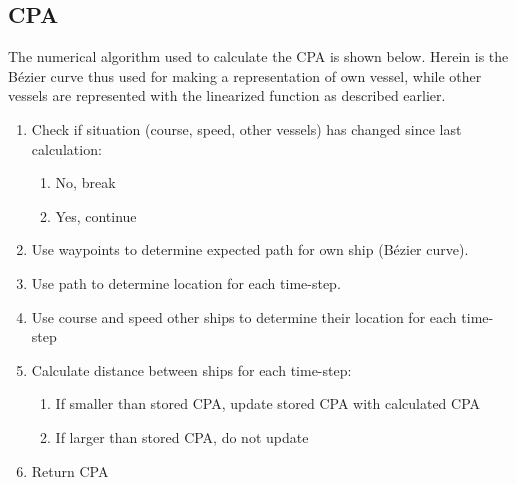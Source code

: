 \subsection{\acf{CPA}}
The numerical algorithm used to calculate the CPA is shown below. Herein is the Bézier curve thus used for making a representation of own vessel, while other vessels are represented with the linearized function as described earlier.
\begin{enumerate}
	\item Check if situation (course, speed, other vessels) has changed since last calculation:
	\begin{enumerate}
		\item No, break
		\item Yes, continue
	\end{enumerate}
	\item Use waypoints to determine expected path for own ship (Bézier curve).
	\item Use path to determine location for each time-step.
	\item Use course and speed other ships to determine their location for each time-step
	\item Calculate distance between ships for each time-step:
	\begin{enumerate}
		\item If smaller than stored CPA, update stored CPA with calculated CPA
		\item If larger than stored CPA, do not update
	\end{enumerate}
	\item Return CPA
\end{enumerate}


